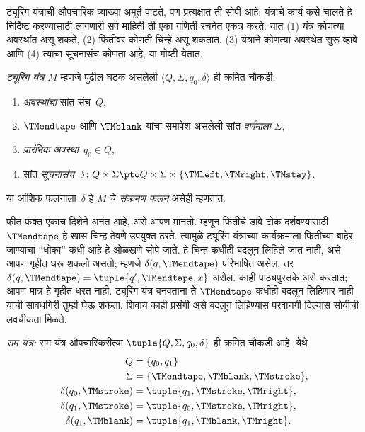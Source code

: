 \documentclass[../../../include/open-logic-section]{subfiles}
\begin{document}

\begin{explain}
ट्यूरिंग यंत्राची औपचारिक व्याख्या अमूर्त वाटते, पण प्रत्यक्षात
ती सोपी आहे: यंत्राचे कार्य कसे चालते हे निर्दिष्ट करण्यासाठी लागणारी
सर्व माहिती ती एका गणिती रचनेत एकत्र करते. यात (1) यंत्र कोणत्या
अवस्थांत असू शकते, (2) फितीवर कोणती चिन्हे असू शकतात, (3) यंत्राने
कोणत्या अवस्थेत सुरू व्हावे आणि (4) त्याचा सूचनासंच कोणता आहे,
या गोष्टी येतात.
\end{explain}

\begin{defn}[ट्यूरिंग यंत्र]
\emph{ट्यूरिंग यंत्र} $M$ म्हणजे पुढील घटक असलेली
$\langle Q, \Sigma, q_0,
\delta\rangle$ ही क्रमित चौकडी:
\begin{enumerate}
\item \emph{अवस्थांचा} सांत संच~$Q$,
\item $\TMendtape$ आणि $\TMblank$ यांचा समावेश असलेली सांत
  \emph{वर्णमाला} $\Sigma$,
\item \emph{प्रारंभिक अवस्था}~$q_0 \in Q$,
\item सांत \emph{सूचनासंच}~$\delta\colon Q \times \Sigma
  \pto Q \times \Sigma \times \{\TMleft, \TMright, \TMstay\}$.
\end{enumerate}
या आंशिक फलनाला~$\delta$ हे $M$ चे \emph{संक्रमण फलन} असेही म्हणतात.
\end{defn}

\begin{explain}
फीत फक्त एकाच दिशेने अनंत आहे, असे आपण मानतो. म्हणून फितीचे
डावे टोक दर्शवण्यासाठी $\TMendtape$ हे खास चिन्ह ठेवणे उपयुक्त ठरते.
त्यामुळे ट्यूरिंग यंत्राच्या कार्यक्रमाला फितीच्या बाहेर जाण्याचा
``धोका'' कधी आहे हे ओळखणे सोपे जाते. हे चिन्ह कधीही बदलून लिहिले
जात नाही, असे आपण गृहीत धरू शकलो असतो; म्हणजे
$\delta(q,\TMendtape)$ परिभाषित असेल, तर
$\delta(q,\TMendtape) = \tuple{q', \TMendtape, x}$ असेल.
काही पाठ्यपुस्तके असे करतात; आपण मात्र हे गृहीत धरत नाही. ट्यूरिंग
यंत्र बनवताना ते $\TMendtape$ कधीही बदलून लिहिणार नाही याची
सावधगिरी तुम्ही घेऊ शकता. शिवाय काही प्रसंगी असे बदलून लिहिण्यास
परवानगी दिल्यास सोयीची लवचीकता मिळते.
\end{explain}

\begin{ex}
\emph{सम यंत्र:} सम यंत्र औपचारिकरीत्या
$\tuple{Q, \Sigma, q_0, \delta}$ ही क्रमित चौकडी आहे. येथे
\begin{align*}
Q & = \{ q_0, q_1 \} \\
\Sigma & = \{ \TMendtape, \TMblank, \TMstroke \}, \\
\delta(q_0, \TMstroke) & = \tuple{q_1, \TMstroke, \TMright},\\
\delta(q_1, \TMstroke) & = \tuple{q_0, \TMstroke, \TMright},\\
\delta(q_1, \TMblank)  & = \tuple{q_1, \TMblank, \TMright}.
\end{align*}
\end{ex}
\end{document}
